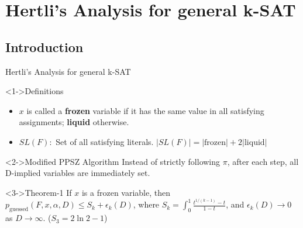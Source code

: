 \documentclass[
	xcolor={svgnames},
	hyperref={pagebackref,bookmarks},
	aspectratio=43,
]{beamer}
\begin{document}
\section{Hertli's Analysis for general k-SAT}
\subsection*{Introduction}
\begin{frame}{Hertli's Analysis for general k-SAT\footnotemark[5]}
	\vspace{-3.5mm}
	\begin{block}<1->{Definitions}
		\begin{itemize}
			\item $x$ is called a \textbf{frozen} variable if it has the same value in all satisfying assignments; \textbf{liquid} otherwise.
			\item $SL(F):$ Set of all satisfying literals. $|SL(F)| = |\text{frozen}| + 2|\text{liquid}|$
		\end{itemize}
	\end{block}
	\begin{block}<2->{Modified PPSZ Algorithm}
		Instead of strictly following $\pi$, after each step, all D-implied variables are immediately set.
	\end{block}
	\begin{block}<3->{Theorem-1}
		If $x$ is a frozen variable, then $p_{\text{guessed}}(F, x, \alpha, D) \leq S_k + \epsilon_k(D)$, where $S_k = \int_{0}^{1}\frac{t^{1/(k-1)} - t}{1 - t}$, and $\epsilon_k(D) \rightarrow 0$ as $D \rightarrow \infty$. \!\qquad\quad($S_3 = 2 \ln 2 - 1$)
	\end{block}
\end{frame}
\end{document}
